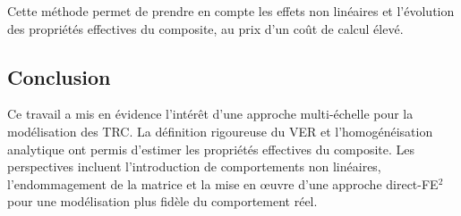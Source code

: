 \documentclass{rapportECL}
\begin{document}
Cette méthode permet de prendre en compte les effets non linéaires et l’évolution des propriétés effectives du composite, au prix d’un coût de calcul élevé.





\newpage
\subsection{Conclusion}

Ce travail a mis en évidence l’intérêt d’une approche multi-échelle pour la modélisation des TRC. La définition rigoureuse du VER et l’homogénéisation analytique ont permis d’estimer les propriétés effectives du composite.
Les perspectives incluent l’introduction de comportements non linéaires, l’endommagement de la matrice et la mise en œuvre d’une approche direct-FE$^2$ pour une modélisation plus fidèle du comportement réel.
\end{document}
